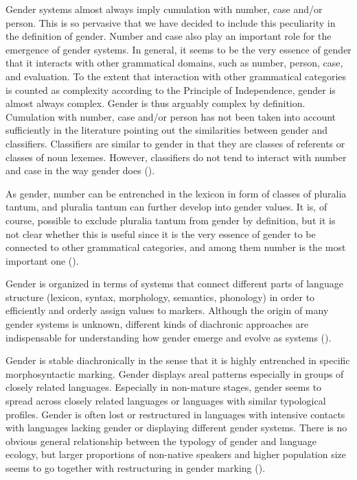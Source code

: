 \documentclass[output=collectionpaper]{langsci/langscibook}
\begin{document}
Gender systems almost always imply cumulation with number, case and/or person. This is so pervasive that we have decided to include this peculiarity in the definition of gender. Number and case also play an important role for the emergence of gender systems. In general, it seems to be the very essence of gender that it interacts with other grammatical domains, such as number, person, case, and evaluation. To the extent that interaction with other grammatical categories is counted as complexity according to the Principle of Independence, gender is almost always complex. Gender is thus arguably complex by definition. Cumulation with number, case and/or person has not been taken into account sufficiently in the literature pointing out the similarities between gender and classifiers. Classifiers are similar to gender in that they are classes of referents or classes of noun lexemes. However, classifiers do not tend to interact with number and case in the way gender does ().

As gender, number can be entrenched in the lexicon in form of classes of pluralia tantum, and pluralia tantum can further develop into gender values. It is, of course, possible to exclude pluralia tantum from gender by definition, but it is not clear whether this is useful since it is the very essence of gender to be connected to other grammatical categories, and among them number is the most important one ().

Gender is organized in terms of systems that connect different parts of language structure (lexicon, syntax, morphology, semantics, phonology) in order to efficiently and orderly assign values to markers. Although the origin of many gender systems is unknown, different kinds of diachronic approaches are indispensable for understanding how gender emerge and evolve as systems ().

Gender is stable diachronically in the sense that it is highly entrenched in specific morphosyntactic marking. Gender displays areal patterns especially in groups of closely related languages. Especially in non-mature stages, gender seems to spread across closely related languages or languages with similar typological profiles. Gender is often lost or restructured in languages with intensive contacts with languages lacking gender or displaying different gender systems. There is no obvious general relationship between the typology of gender and language ecology, but larger proportions of non-native speakers and higher population size seems to go together with restructuring in gender marking ().
\end{document}
